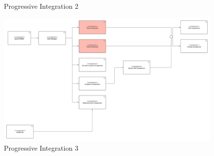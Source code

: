\begin{itemize}
\begin{figure}[h!]
        \caption{\label{fig:QueueInternal2.1}{Progressive Integration 2}}
    \end{figure}
    \FloatBarrier 
    \begin{figure}[h!]
        \centering
        \includegraphics[width=.9\textwidth]{Images/TestDiagram/Queue/queueserviceprogressive/3.png}
        \caption{\label{fig:QueueInternal3}{Progressive Integration 3}}
    \end{figure}
    \FloatBarrier 


    
\end{itemize}

